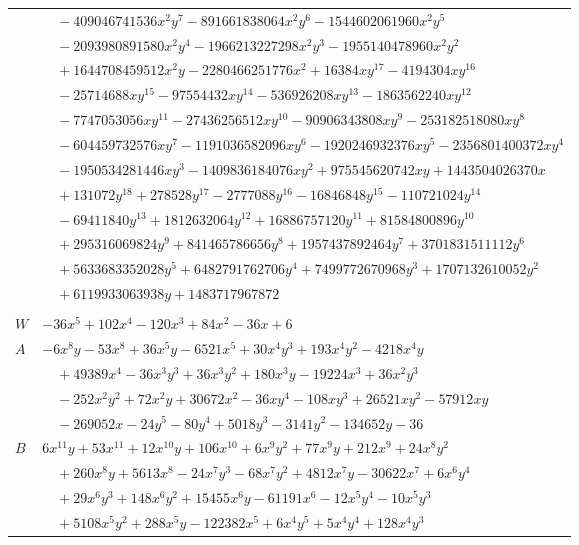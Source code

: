 \documentclass[11pt]{article}
\begin{document}
\begin{longtable}{@{}ll@{}}
 & $\quad -409046741536x^{2}y^{7}-891661838064x^{2}y^{6}-1544602061960x^{2}y^{5}$\\
 & $\quad -2093980891580x^{2}y^{4}-1966213227298x^{2}y^{3}-1955140478960x^{2}y^{2}$\\
 & $\quad +1644708459512x^{2}y-2280466251776x^{2}+16384xy^{17}-4194304xy^{16}$\\
 & $\quad -25714688xy^{15}-97554432xy^{14}-536926208xy^{13}-1863562240xy^{12}$\\
 & $\quad -7747053056xy^{11}-27436256512xy^{10}-90906343808xy^{9}-253182518080xy^{8}$\\
 & $\quad -604459732576xy^{7}-1191036582096xy^{6}-1920246932376xy^{5}-2356801400372xy^{4}$\\
 & $\quad -1950534281446xy^{3}-1409836184076xy^{2}+975545620742xy+1443504026370x$\\
 & $\quad +131072y^{18}+278528y^{17}-2777088y^{16}-16846848y^{15}-110721024y^{14}$\\
 & $\quad -69411840y^{13}+1812632064y^{12}+16886757120y^{11}+81584800896y^{10}$\\
 & $\quad +295316069824y^{9}+841465786656y^{8}+1957437892464y^{7}+3701831511112y^{6}$\\
 & $\quad +5633683352028y^{5}+6482791762706y^{4}+7499772670968y^{3}+1707132610052y^{2}$\\
 & $\quad +6119933063938y+1483717967872$\\
\addlinespace[3pt]
\multicolumn{2}{@{}l}{$g=2$, $i=34$, $m=6$, neighbours $4,8,15,24,33,35,42$}\\
$W$ & $-36x^{5}+102x^{4}-120x^{3}+84x^{2}-36x+6$\\
$A$ & $-6x^{8}y-53x^{8}+36x^{5}y-6521x^{5}+30x^{4}y^{3}+193x^{4}y^{2}-4218x^{4}y$\\
 & $\quad +49389x^{4}-36x^{3}y^{3}+36x^{3}y^{2}+180x^{3}y-19224x^{3}+36x^{2}y^{3}$\\
 & $\quad -252x^{2}y^{2}+72x^{2}y+30672x^{2}-36xy^{4}-108xy^{3}+26521xy^{2}-57912xy$\\
 & $\quad -269052x-24y^{5}-80y^{4}+5018y^{3}-3141y^{2}-134652y-36$\\
$B$ & $6x^{11}y+53x^{11}+12x^{10}y+106x^{10}+6x^{9}y^{2}+77x^{9}y+212x^{9}+24x^{8}y^{2}$\\
 & $\quad +260x^{8}y+5613x^{8}-24x^{7}y^{3}-68x^{7}y^{2}+4812x^{7}y-30622x^{7}+6x^{6}y^{4}$\\
 & $\quad +29x^{6}y^{3}+148x^{6}y^{2}+15455x^{6}y-61191x^{6}-12x^{5}y^{4}-10x^{5}y^{3}$\\
 & $\quad +5108x^{5}y^{2}+288x^{5}y-122382x^{5}+6x^{4}y^{5}+5x^{4}y^{4}+128x^{4}y^{3}$\\

\end{longtable}
\end{document}
